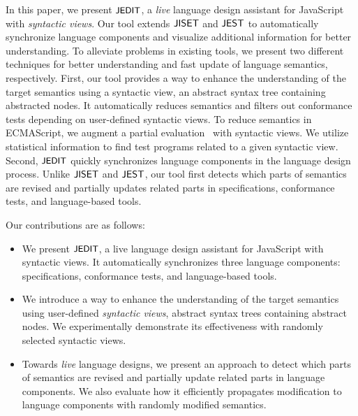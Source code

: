 In this paper, we present $\textsf{\small JEDIT}$, a \textit{live} language design assistant for
JavaScript with \textit{syntactic views}. Our tool extends $\textsf{JISET}$ and $\textsf{JEST}$
to automatically synchronize language components and visualize additional
information for better understanding. To alleviate problems in existing tools,
we present two different techniques for better understanding and fast update of
language semantics, respectively. First, our tool provides a way to enhance the
understanding of the target semantics using a syntactic view, an abstract syntax
tree containing abstracted nodes. It automatically reduces semantics and filters
out conformance tests depending on user-defined syntactic views. To reduce
semantics in ECMAScript, we augment a partial evaluation~\cite{peval,
peval-survey} with syntactic views. We utilize statistical information to find
test programs related to a given syntactic view. Second, $\textsf{\small JEDIT}$ quickly
synchronizes language components in the language design process. Unlike $\textsf{JISET}$
and $\textsf{JEST}$, our tool first detects which parts of semantics are revised and
partially updates related parts in specifications, conformance tests, and
language-based tools.

Our contributions are as follows:
\begin{itemize}
  \item We present $\textsf{\small JEDIT}$, a live language design assistant for JavaScript with
    syntactic views. It automatically synchronizes three language components:
    specifications, conformance tests, and language-based tools.
  \item We introduce a way to enhance the understanding of the target semantics
    using user-defined \textit{syntactic views}, abstract syntax trees
    containing abstract nodes. We experimentally demonstrate its effectiveness
    with randomly selected syntactic views.
  \item Towards \textit{live} language designs, we present an approach to detect
    which parts of semantics are revised and partially update related parts in
    language components. We also evaluate how it efficiently propagates
    modification to language components with randomly modified semantics.
\end{itemize}
